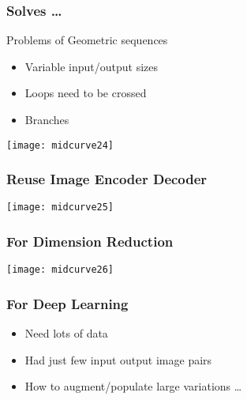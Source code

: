 \begin{frame}[fragile]\frametitle{Solves \ldots}
Problems of Geometric sequences

	\begin{itemize}
	\item Variable input/output sizes
	\item Loops need to be crossed
	\item Branches
	\end{itemize}
\begin{center}
\texttt{[image: midcurve24]}
\end{center}	
\end{frame}

\begin{frame}[fragile]\frametitle{Reuse Image Encoder Decoder}
\begin{center}
\texttt{[image: midcurve25]}
\end{center}	
\end{frame}

\begin{frame}[fragile]\frametitle{For Dimension Reduction}
\begin{center}
\texttt{[image: midcurve26]}
\end{center}	
\end{frame}

\begin{frame}[fragile]\frametitle{For Deep Learning}
	\begin{itemize}
	\item Need lots of data
	\item Had just few input output image pairs
	\item How to augment/populate large variations \ldots
	\end{itemize}
\end{frame}
